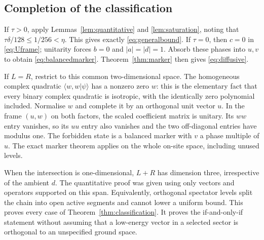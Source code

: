 \documentclass[11pt,a4paper]{article}
\theoremstyle{remark}\newtheorem{remark}[theorem]{Remark}
\begin{document}
\subsection{Completion of the classification}
If $\tau>0$, apply Lemmas~\ref{lem:quantitative} and \ref{lem:saturation}, noting that $\tau\delta/128\le1/256<\eta$. This gives exactly \eqref{eq:generalbound}. If $\tau=0$, then $c=0$ in \eqref{eq:Uframe}; unitarity forces $b=0$ and $|a|=|d|=1$. Absorb these phases into $u,v$ to obtain \eqref{eq:balancedmarker}. Theorem~\ref{thm:marker} then gives \eqref{eq:diffusive}.

If $L=R$, restrict to this common two-dimensional space. The homogeneous complex quadratic $\langle w,w|\psi\rangle$ has a nonzero zero $w$: this is the elementary fact that every binary complex quadratic is isotropic, with the identically zero polynomial included. Normalise $w$ and complete it by an orthogonal unit vector $u$. In the frame $(u,w)$ on both factors, the scaled coefficient matrix is unitary. Its $ww$ entry vanishes, so its $uu$ entry also vanishes and the two off-diagonal entries have modulus one. The forbidden state is a balanced marker with $v$ a phase multiple of $u$. The exact marker theorem applies on the whole on-site space, including unused levels.

When the intersection is one-dimensional, $L+R$ has dimension three, irrespective of the ambient $d$. The quantitative proof was given using only vectors and operators supported on this span. Equivalently, orthogonal spectator levels split the chain into open active segments and cannot lower a uniform bound. This proves every case of Theorem~\ref{thm:classification}. It proves the if-and-only-if statement without assuming that a low-energy vector in a selected sector is orthogonal to an unspecified ground space.
\end{document}
